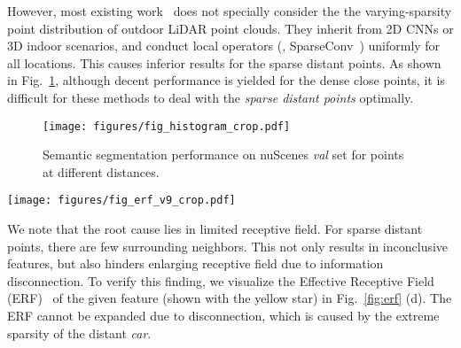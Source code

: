 \documentclass[10pt,twocolumn,letterpaper]{article}
\begin{document}
However, most existing work~\cite{3DSemanticSegmentationWithSubmanifoldSparseConvNet,SubmanifoldSparseConvNet,choy20194d,yan2021sparse,tang2020searching,cheng20212,xu2021rpvnet,yan20222dpass} does not specially consider the the varying-sparsity point distribution of outdoor LiDAR point clouds. They inherit from 2D CNNs or 3D indoor scenarios, and conduct local operators (\eg, SparseConv~\cite{3DSemanticSegmentationWithSubmanifoldSparseConvNet,SubmanifoldSparseConvNet}) uniformly for all locations. This causes inferior results for the sparse distant points. As shown in Fig.~\ref{fig:histogram}, although decent performance is yielded for the dense close points, it is difficult for these methods to deal with the \textit{sparse distant points} optimally. 



\begin{figure}
\begin{center}
\texttt{[image: figures/fig\_histogram\_crop.pdf]}
\end{center}
\vspace{-0.4cm}
\caption{Semantic segmentation performance on nuScenes \textit{val} set for points at different distances.}
\label{fig:histogram}
\vspace{-0.3cm}
\end{figure}

\begin{figure*}
\begin{center}
\texttt{[image: figures/fig\_erf\_v9\_crop.pdf]}
\end{center}
\vspace{-0.6cm}
\caption{Effective Receptive Field (ERF) of SparseConv and ours. (a) LiDAR point cloud. (b) Radial window partition. Only a single radial window is shown. Points inside the window are marked in red. (c) Zoom-in sparse distant points. A sparse \textit{car} is circled in yellow. (d) ERF of SparseConv, given the point of interest (with yellow star). White and red denote high contribution. (e) ERF of ours.}
\label{fig:erf}
\end{figure*}

We note that the root cause lies in limited receptive field. For sparse distant points, there are few surrounding neighbors. This not only results in inconclusive features, but also hinders enlarging receptive field due to information disconnection. To verify this finding, we visualize the Effective Receptive Field (ERF)~\cite{luo2016understanding} of the given feature (shown with the yellow star) in Fig.~\ref{fig:erf} (d). The ERF cannot be expanded due to disconnection, which is caused by the extreme sparsity of the distant \textit{car}.
\end{document}
